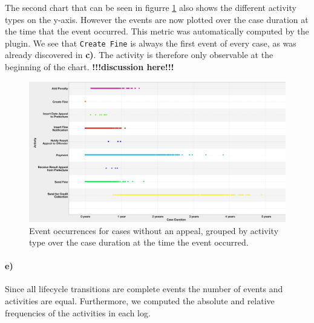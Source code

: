 \documentclass[12pt]{report}
\begin{document}
The second chart that can be seen in figurre \ref{fig:dotted_duration} also shows the different activity types on the y-axis. However the events are now plotted over the case duration at the time that the event occurred. This metric was automatically computed by the plugin. We see that \texttt{Create Fine} is always the first event of every case, as was already discovered in \textbf{c)}. The activity is therefore only observable at the beginning of the chart. \textbf{!!!discussion here!!!}

\begin{figure}[H]
  \centering
  \includegraphics[width=\textwidth]{figures/dotted_duration.png}
  \caption{Event occurrences for cases without an appeal, grouped by activity type over the case duration at the time the event occurred.}
  \label{fig:dotted_duration}
\end{figure}

\paragraph{\textbf{e)}}


Since all lifecycle transitions are complete events the number of events and activities are equal. Furthermore, we computed the absolute and relative frequencies of the activities in each log.
\end{document}
